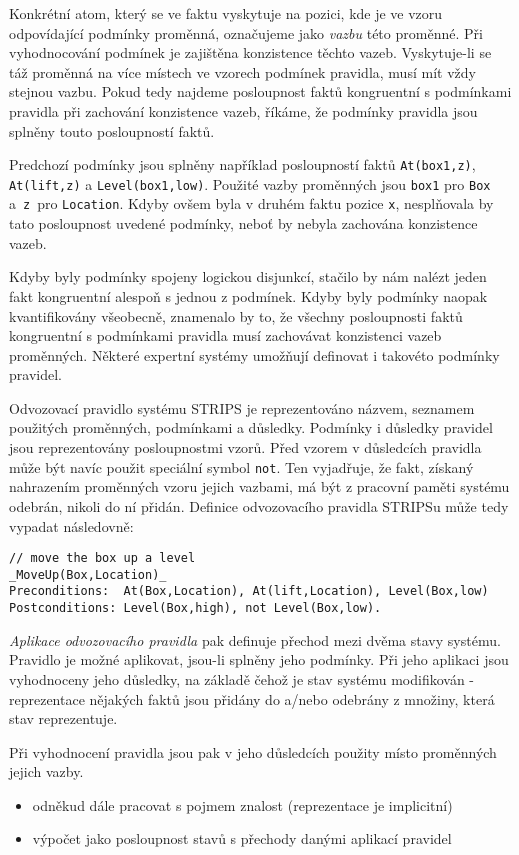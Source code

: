 Konkrétní atom, který se ve faktu vyskytuje na pozici, kde je ve vzoru
odpovídající podmínky proměnná, označujeme jako \emph{vazbu} této proměnné. Při
vyhodnocování podmínek je zajištěna konzistence těchto vazeb. Vyskytuje-li se
táž proměnná na více místech ve vzorech podmínek pravidla, musí mít vždy stejnou
vazbu. Pokud tedy najdeme posloupnost faktů kongruentní s podmínkami pravidla
při zachování konzistence vazeb, říkáme, že podmínky pravidla jsou splněny touto
posloupností faktů.

Predchozí podmínky jsou splněny například posloupností faktů \verb|At(box1,z)|,
\verb|At(lift,z)| a \verb|Level(box1,low)|. Použité vazby proměnných jsou
\verb|box1| pro \verb|Box| a~\verb|z|~pro \verb|Location|. Kdyby ovšem byla v
druhém faktu pozice \verb|x|, nesplňovala by tato posloupnost uvedené podmínky,
neboť by nebyla zachována konzistence vazeb.

Kdyby byly podmínky spojeny logickou disjunkcí, stačilo by nám nalézt jeden
fakt kongruentní alespoň s jednou z podmínek. Kdyby byly podmínky naopak
kvantifikovány všeobecně, znamenalo by to, že všechny posloupnosti faktů
kongruentní s podmínkami pravidla musí zachovávat konzistenci vazeb proměnných.
Některé expertní systémy umožňují definovat i takovéto podmínky pravidel.

Odvozovací pravidlo systému STRIPS je reprezentováno názvem, seznamem použitých
proměnných, podmínkami a důsledky. Podmínky i důsledky pravidel jsou
reprezentovány posloupnostmi vzorů. Před vzorem v důsledcích pravidla může
být navíc použit speciální symbol \verb|not|. Ten vyjadřuje, že fakt, získaný
nahrazením proměnných vzoru jejich vazbami, má být z pracovní paměti systému
odebrán, nikoli do ní přidán.  Definice odvozovacího pravidla STRIPSu může tedy
vypadat následovně:
\begin{verbatim}
// move the box up a level
_MoveUp(Box,Location)_
Preconditions:  At(Box,Location), At(lift,Location), Level(Box,low)
Postconditions: Level(Box,high), not Level(Box,low).
\end{verbatim}

\emph{Aplikace odvozovacího pravidla} pak definuje přechod mezi dvěma stavy
systému. Pravidlo je možné aplikovat, jsou-li splněny jeho podmínky. Při jeho
aplikaci jsou vyhodnoceny jeho důsledky, na základě čehož je stav systému
modifikován - reprezentace nějakých faktů jsou přidány do a/nebo odebrány z
množiny, která stav reprezentuje.

Při vyhodnocení pravidla jsou pak v jeho důsledcích použity místo proměnných
jejich vazby.

\begin{framed}
  \begin{itemize}
    \item odněkud dále pracovat s pojmem znalost (reprezentace je implicitní)
    \item výpočet jako posloupnost stavů s přechody danými aplikací pravidel
  \end{itemize}
\end{framed}

